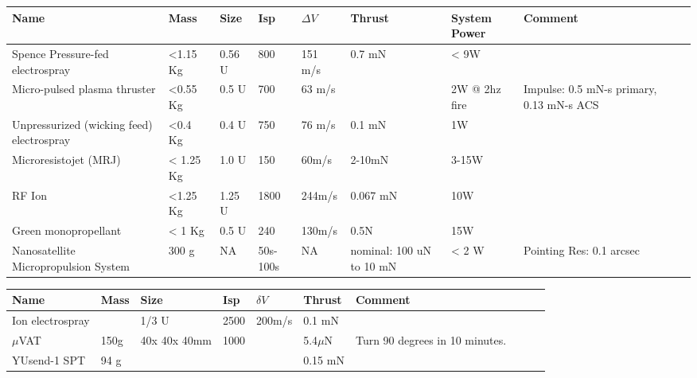 \begin{center}
     \begin{tabular}{ |p{2.25cm} | p{1cm} | p{1cm} |  p{1cm} | l | p{2cm} | l | p{4cm} | p{1cm} | p{2cm} |  }
     \hline

       {\bf Name} & {\bf Mass} & {\bf Size} & {\bf Isp} & {\bf $\Delta V$} & {\bf Thrust} & {\bf System Power}&{\bf Comment}  \\ \hline


     Spence Pressure-fed electrospray \cite{Spence} & <1.15 Kg& 0.56 U& 800 & 151 m/s & 0.7 mN &< 9W &   \\ \hline

     Micro-pulsed plasma thruster \cite{Spence} & <0.55 Kg& 0.5 U & 700 & 63 m/s&  & 2W @ 2hz fire &  Impulse: 0.5 mN-s primary, 0.13 mN-s ACS\\ \hline

     Unpressurized (wicking feed) electrospray \cite{Spence} & <0.4 Kg& 0.4 U& 750 & 76 m/s & 0.1 mN & 1W &  \\
     \hline

     Microresistojet (MRJ) \cite{Spence} & < 1.25 Kg& 1.0 U&150 & 60m/s & 2-10mN & 3-15W&   \\
     \hline

     RF Ion \cite{Spence} & <1.25 Kg& 1.25 U& 1800 & 244m/s & 0.067 mN &10W &   \\
     \hline

     Green monopropellant \cite{Spence} & < 1 Kg& 0.5 U& 240 & 130m/s & 0.5N & 15W&   \\
     \hline

	Nanosatellite Micropropulsion System \cite{Spence} & 300 g & NA &	50s-100s & NA & nominal: 100 uN to 10 mN & < 2 W & Pointing Res: 0.1 arcsec \\ \hline

     \end{tabular}
\end{center} 

\begin{center}
     \begin{tabular}{ |p{2cm} | p{1cm} | p{1cm} |  p{1cm} | l | l | l | p{5cm} | p{1cm} | p{1cm} }
     \hline

       {\bf Name} & {\bf Mass} & {\bf Size} & {\bf Isp} & {\bf $\delta V$} & {\bf Thrust} & {\bf Comment}  \\ \hline

     Ion electrospray \cite{Ref:thr9} & & 1/3 U & 2500 & 200m/s & 0.1 mN&  \\ \hline
     {$\mu$}VAT&150g& 40x 40x 40mm & 1000&   & 5.4{$\mu$}N & Turn 90 degrees in 10 minutes.\\ \hline
     YUsend-1 SPT \cite{Ref:thr10} &94 g &   &   &   & 0.15 mN & \\ \hline
     \end{tabular}
\end{center}

